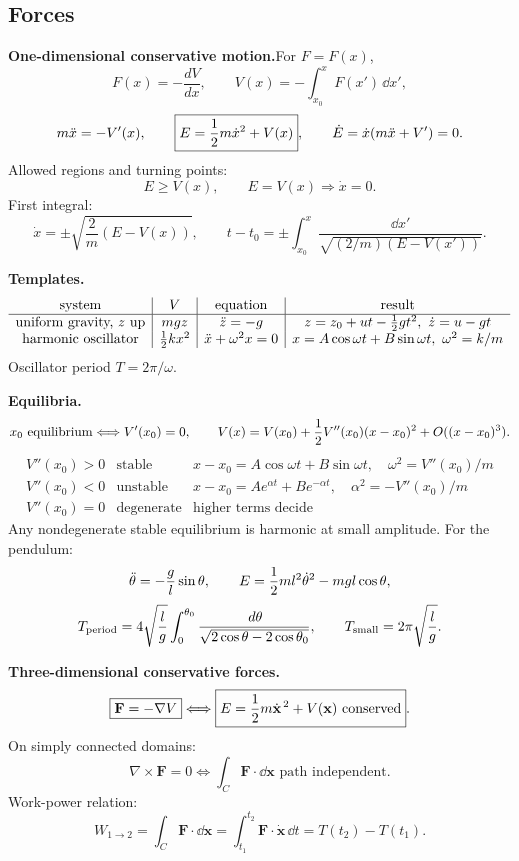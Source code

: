 \subsection{Forces}

\noindent\textbf{One-dimensional conservative motion.}\quad For $F=F(x)$,
\[
  F(x)=-\frac{dV}{dx},\qquad
  V(x)=-\int_{x_0}^{x}F(x')\,\dd x',
\]
\[
  m\ddot x=-V'(x),\qquad
  \boxed{E=\frac{1}{2} m\dot x^2+V(x)},\qquad
  \dot E=\dot x(m\ddot x+V')=0.
\]
Allowed regions and turning points:
\[
  E\ge V(x),\qquad E=V(x)\Rightarrow \dot x=0.
\]
First integral:
\[
  \dot x=\pm\sqrt{\frac{2}{m}(E-V(x))},\qquad
  t-t_0=\pm\int_{x_0}^{x}\frac{\dd x'}{\sqrt{(2/m)(E-V(x'))}}.
\]

\noindent\textbf{Templates.}\quad
\[
\begin{array}{c|c|c|c}
\text{system} & V & \text{equation} & \text{result}\\ \hline
\text{uniform gravity, }z\text{ up} & mgz & \ddot z=-g &
z=z_0+ut-\frac{1}{2} gt^2,\ \dot z=u-gt\\
\text{harmonic oscillator} & \frac{1}{2} kx^2 & \ddot x+\omega^2x=0 &
x=A\cos\omega t+B\sin\omega t,\ \omega^2=k/m
\end{array}
\]
Oscillator period $T=2\pi/\omega$. 

\noindent\textbf{Equilibria.}\quad
\[
  x_0\text{ equilibrium}\Longleftrightarrow V'(x_0)=0,\qquad
  V(x)=V(x_0)+\frac{1}{2} V''(x_0)(x-x_0)^2+O((x-x_0)^3).
\]
\[
\begin{array}{c|c|c}
V''(x_0)>0 & \text{stable} &
x-x_0=A\cos\omega t+B\sin\omega t,\quad \omega^2=V''(x_0)/m\\
V''(x_0)<0 & \text{unstable} &
x-x_0=Ae^{\alpha t}+Be^{-\alpha t},\quad \alpha^2=-V''(x_0)/m\\
V''(x_0)=0 & \text{degenerate} & \text{higher terms decide}
\end{array}
\]
Any nondegenerate stable equilibrium is harmonic at small amplitude. For the
pendulum:
\[
  \ddot\theta=-\frac{g}{l}\sin\theta,\qquad
  E=\frac{1}{2} ml^2\dot\theta^2-mgl\cos\theta,
\]
\[
  T_{\rm period}=4\sqrt{\frac{l}{g}}\int_0^{\theta_0}
  \frac{\,d\theta}{\sqrt{2\cos\theta-2\cos\theta_0}},
  \qquad T_{\rm small}=2\pi\sqrt{\frac{l}{g}}.
\]

\noindent\textbf{Three-dimensional conservative forces.}\quad
\[
  \boxed{\mathbf F=-\nabla V}
  \Longleftrightarrow
  \boxed{E=\frac{1}{2} m\dot{\mathbf x}^{\,2}+V(\mathbf x)\text{ conserved}}.
\]
On simply connected domains:
\[
  \nabla\times\mathbf F=0
  \Longleftrightarrow
  \int_C\mathbf F\cdot\dd\mathbf x\text{ path independent}.
\]
Work-power relation:
\[
  W_{1\to2}=\int_C\mathbf F\cdot\dd\mathbf x
  =\int_{t_1}^{t_2}\mathbf F\cdot\dot{\mathbf x}\,\dd t
  =T(t_2)-T(t_1).
\]

